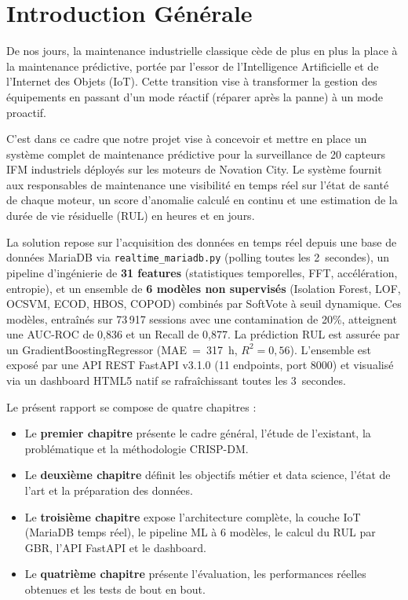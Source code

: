\documentclass[12pt,a4paper]{report}
\begin{document}
\chapter*{Introduction Générale}

De nos jours, la maintenance industrielle classique cède de plus en plus la place à la
maintenance prédictive, portée par l'essor de l'Intelligence Artificielle et de l'Internet
des Objets (IoT). Cette transition vise à transformer la gestion des équipements en
passant d'un mode réactif (réparer après la panne) à un mode proactif.

C'est dans ce cadre que notre projet vise à concevoir et mettre en place un système
complet de maintenance prédictive pour la surveillance de 20 capteurs IFM industriels
déployés sur les moteurs de Novation City. Le système fournit aux responsables de
maintenance une visibilité en temps réel sur l'état de santé de chaque moteur, un score
d'anomalie calculé en continu et une estimation de la durée de vie résiduelle (RUL)
en heures et en jours.

La solution repose sur l'acquisition des données en temps réel depuis une base de données
MariaDB via \texttt{realtime\_mariadb.py} (polling toutes les 2~secondes), un pipeline
d'ingénierie de \textbf{31 features} (statistiques temporelles, FFT, accélération, entropie),
et un ensemble de \textbf{6 modèles non supervisés} (Isolation Forest, LOF, OCSVM, ECOD,
HBOS, COPOD) combinés par SoftVote à seuil dynamique. Ces modèles, entraînés sur
73\,917 sessions avec une contamination de 20\%, atteignent une AUC-ROC de 0,836 et un
Recall de 0,877. La prédiction RUL est assurée par un GradientBoostingRegressor (MAE~=~317~h,
$R^2=0{,}56$). L'ensemble est exposé par une API REST FastAPI v3.1.0 (11 endpoints,
port 8000) et visualisé via un dashboard HTML5 natif se rafraîchissant toutes les 3~secondes.

Le présent rapport se compose de quatre chapitres :
\begin{itemize}
  \item Le \textbf{premier chapitre} présente le cadre général, l'étude de l'existant, la problématique et la méthodologie CRISP-DM.
  \item Le \textbf{deuxième chapitre} définit les objectifs métier et data science, l'état de l'art et la préparation des données.
  \item Le \textbf{troisième chapitre} expose l'architecture complète, la couche IoT (MariaDB temps réel), le pipeline ML à 6 modèles, le calcul du RUL par GBR, l'API FastAPI et le dashboard.
  \item Le \textbf{quatrième chapitre} présente l'évaluation, les performances réelles obtenues et les tests de bout en bout.
\end{itemize}
\end{document}
